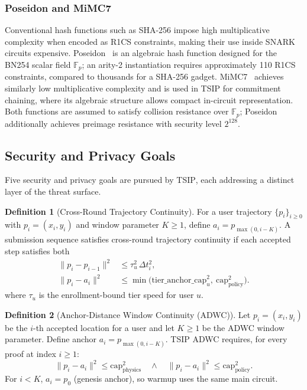 \documentclass[conference]{IEEEtran}
\theoremstyle{definition}
\newtheorem{definition}{Definition}
\theoremstyle{plain}
\begin{document}
\subsubsection*{Poseidon and MiMC7}
Conventional hash functions such as SHA-256 impose high
multiplicative complexity when encoded as R1CS constraints, making
their use inside SNARK circuits expensive.
Poseidon~\cite{Grassi2021Poseidon} is an algebraic hash function
designed for the BN254 scalar field $\mathbb{F}_p$; an arity-2
instantiation requires approximately 110 R1CS constraints, compared
to thousands for a SHA-256 gadget.
MiMC7~\cite{Albrecht2016MiMC} achieves similarly low multiplicative
complexity and is used in \textsc{TSIP} for commitment chaining,
where its algebraic structure allows compact in-circuit
representation.
Both functions are assumed to satisfy collision resistance over
$\mathbb{F}_p$; Poseidon additionally achieves preimage resistance
with security level $2^{128}$.

\subsection{Security and Privacy Goals}\label{sec:prelim-goals}

Five security and privacy goals are pursued by \textsc{TSIP},
each addressing a distinct layer of the threat surface.

\begin{definition}[Cross-Round Trajectory Continuity]
\label{def:cross-round}
For a user trajectory $\{p_i\}_{i\ge 0}$ with $p_i=(x_i,y_i)$ and
window parameter $K\!\ge\!1$, define $a_i = p_{\max(0,i-K)}$.
A submission sequence satisfies cross-round trajectory continuity if each
accepted step satisfies both
\[
\begin{aligned}
\|p_i - p_{i-1}\|^2 &\le \tau_u^2 \,\Delta t_i^2, \\
\|p_i - a_i\|^2 &\le \min\!\bigl(\mathrm{tier\_anchor\_cap}_u^2,\ \mathrm{cap}_{\mathrm{policy}}^2\bigr).
\end{aligned}
\]
where $\tau_u$ is the enrollment-bound tier speed for user $u$.
\end{definition}

\begin{definition}[Anchor-Distance Window Continuity (ADWC)]
\label{def:adwc}
Let $p_i=(x_i,y_i)$ be the $i$-th accepted location for a user and let
$K \ge 1$ be the ADWC window parameter. Define anchor
$a_i = p_{\max(0,i-K)}$.
TSIP ADWC requires, for every proof at index $i \ge 1$:
\begin{equation}
\|p_i-a_i\|^2 \le \mathrm{cap}_{\mathrm{physics}}^2
\quad\wedge\quad
\|p_i-a_i\|^2 \le \mathrm{cap}_{\mathrm{policy}}^2 .
\end{equation}
For $i<K$, $a_i=p_0$ (genesis anchor), so warmup uses the same main circuit.
\end{definition}
\end{document}
